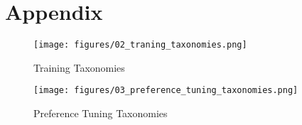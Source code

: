 \section{Appendix}

\begin{figure}
    \centering
    \texttt{[image: figures/02\_traning\_taxonomies.png]}
    \caption{Training Taxonomies}
    \label{fig:traning_taxonomies}
\end{figure}

\begin{figure}
    \centering
    \texttt{[image: figures/03\_preference\_tuning\_taxonomies.png]}
    \caption{Preference Tuning Taxonomies}
    \label{fig:preference_tuning_taxonogy}
\end{figure}

%     
